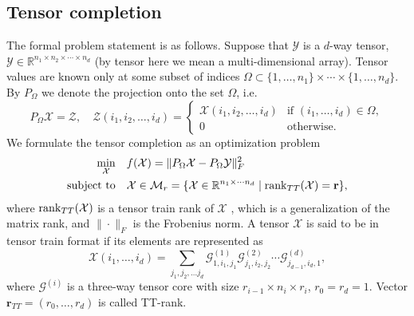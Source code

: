 

\subsection{Tensor completion}
\label{sec:tensor_completion}

The formal problem statement is as follows.
Suppose that $\mathcal{Y}$ is a $d$-way tensor,
$\mathcal{Y} \in \mathbb{R}^{n_1 \times n_2 \times \cdots \times n_d}$
(by tensor here we mean a multi-dimensional array).
Tensor values are known only at some subset of indices
$\Omega \subset \{1, \ldots, n_1\} \times \cdots \times \{1, \ldots, n_d\}$.
By $P_\Omega$ we denote the projection onto the set $\Omega$, i.e.
\[
P_{\Omega} \mathcal{X} = \mathcal{Z}, \quad
\mathcal{Z}(i_1, i_2, \ldots, i_d) = \begin{cases}
\mathcal{X}(i_1, i_2, \ldots, i_d) & \mbox{if } (i_1, \ldots, i_d) \in \Omega, \\
0 & \mbox{otherwise}.
\end{cases}
\]
We formulate the tensor completion as an optimization problem
\begin{equation}
\begin{aligned}
\label{eq:tensor_completion}
    \min_{\mathcal{X}} \quad &  f(\mathcal{X}) = \|P_{\Omega} \mathcal{X} - P_{\Omega} \mathcal{Y}\|_F^2 \\
    \mbox{subject to} \quad & \mathcal{X} \in \mathcal{M}_r =
    \{\mathcal{X} \in \mathbb{R}^{n_1 \times \cdots n_d} \; | \; {\rm rank}_{TT}
    (\mathcal{X}) = \mathbf{r} \},
\end{aligned}
\end{equation}
where ${\rm rank}_{TT}(\mathcal{X})$ is a tensor train rank of $\mathcal{X}$ \citep{oseledets2011tensor},
which is a generalization of the matrix rank,
and $\|\cdot\|_F$ is the Frobenius norm.
A tensor $\mathcal{X}$ is said to be in tensor train format if its elements are represented as
\[
    \mathcal{X}(i_1, \ldots, i_d) = \sum_{j_1, j_2, \ldots j_d}
    \mathcal{G}^{(1)}_{1, i_1, j_1}
    \mathcal{G}^{(2)}_{j_1, i_2, j_2} \cdots
    \mathcal{G}^{(d)}_{j_{d - 1}, i_d, 1},
\]
where $\mathcal{G}^{(i)}$ is a three-way tensor core with size
$r_{i - 1} \times n_i \times r_{i}$, $r_0 = r_{d} = 1$.
Vector $\mathbf{r}_{TT} = (r_0, \ldots, r_d)$ is called TT-rank.


